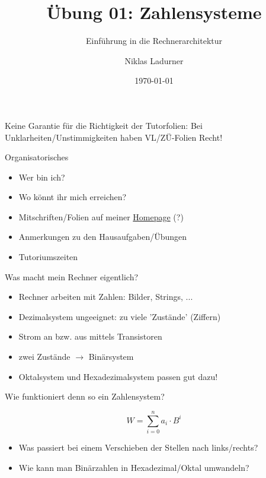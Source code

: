 \documentclass[
  german,            %
  aspectratio=169,    %
]{tumbeamer}
\title{Übung 01: Zahlensysteme}
\subtitle{Einführung in die Rechnerarchitektur}
\author{Niklas Ladurner}
\institute{\theChairName\\\theDepartmentName\\\theUniversityName}
\date[\today]{\today}
\begin{document}
\maketitle

\begin{frame}[c]{}{}
  \begin{center}
    \LARGE  Keine Garantie für die Richtigkeit der Tutorfolien: Bei Unklarheiten/Unstimmigkeiten 
    haben VL/ZÜ-Folien Recht!
  \end{center}
\end{frame}

\begin{frame}[c]{Organisatorisches}{}
  \begin{itemize}
    \item Wer bin ich?
    \item Wo könnt ihr mich erreichen?
    \item Mitschriften/Folien auf meiner \href{https://home.in.tum.de/~ladu/}{Homepage} (?) 
    \item Anmerkungen zu den Hausaufgaben/Übungen
    \item Tutoriumszeiten
  \end{itemize}
\end{frame}

\begin{frame}[c]{Was macht mein Rechner eigentlich?}{}
    \begin{itemize}
      \item Rechner arbeiten mit Zahlen: Bilder, Strings, ...
      \item Dezimalsystem ungeeignet: zu viele 'Zustände' (Ziffern)
      \item Strom an bzw. aus mittels Transistoren
      \item zwei Zustände $\rightarrow$ Binärsystem
      \item Oktalsystem und Hexadezimalsystem passen gut dazu!
    \end{itemize}
  \end{frame}

  \begin{frame}[c]{Wie funktioniert denn so ein Zahlensystem?}{}
      \begin{center}
        \LARGE $$W=\sum_{i=0}^na_i\cdot B^i$$
      \end{center}
      \hspace{1cm}
      \begin{itemize}
        \item Was passiert bei einem Verschieben der Stellen nach links/rechts?
        \item Wie kann man Binärzahlen in Hexadezimal/Oktal umwandeln?
      \end{itemize}
  \end{frame}
\end{document}
